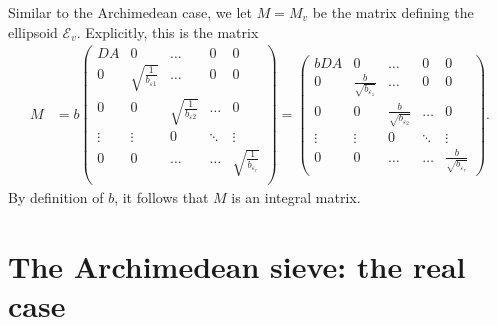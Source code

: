 \documentclass[11pt]{report}
\theoremstyle{definition}
\begin{document}
Similar to the Archimedean case, we let $M=M_v$ be the matrix defining the ellipsoid $\mathcal{E}_{v}$. Explicitly, this is the matrix
\begin{align*}
  M & = b \begin{pmatrix}
    DA & 0 & \dots & 0 & 0\\
    0 & \sqrt{\frac{1}{b_{\varepsilon 1}}} & \dots & 0 & 0\\
    0 & 0  & \sqrt{\frac{1}{b_{\varepsilon 2}}} & \dots & 0\\
    \vdots & \vdots &0 &  \ddots & \vdots\\
    0 & 0 & \dots & \dots & \sqrt{\frac{1}{b_{\varepsilon_r}}} \\
  \end{pmatrix}
  = \begin{pmatrix}
    bDA & 0 & \dots & 0 & 0\\
    0 & \frac{b}{\sqrt{b_{\varepsilon_1}}} & \dots & 0 & 0\\
    0 & 0  & \frac{b}{\sqrt{b_{\varepsilon_2}}} & \dots & 0\\
    \vdots & \vdots &0 &  \ddots & \vdots\\
    0 & 0 & \dots & \dots & \frac{b}{\sqrt{b_{\varepsilon_r}}}
  \end{pmatrix}.
\end{align*}
By definition of $b$, it follows that $M$ is an integral matrix.





\section{The Archimedean sieve: the real case}
\label{sec:archsieve}
\end{document}
